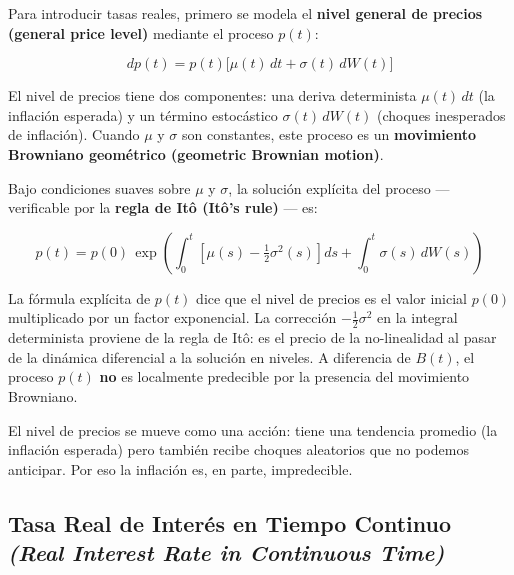 \documentclass[12pt]{article}
\begin{document}
Para introducir tasas reales, primero se modela el \textbf{nivel general de precios (general price level)} mediante el proceso $p(t)$:

\begin{equation}
  dp(t) = p(t)\bigl[\mu(t)\,dt + \sigma(t)\,dW(t)\bigr]
\end{equation}

\begin{intuicionmat}
El nivel de precios tiene dos componentes: una deriva determinista $\mu(t)\,dt$ (la inflaci\'on esperada) y un t\'ermino estoc\'astico $\sigma(t)\,dW(t)$ (choques inesperados de inflaci\'on). Cuando $\mu$ y $\sigma$ son constantes, este proceso es un \textbf{movimiento Browniano geom\'etrico (geometric Brownian motion)}.
\end{intuicionmat}

Bajo condiciones suaves sobre $\mu$ y $\sigma$, la soluci\'on expl\'icita del proceso --- verificable por la \textbf{regla de It\^o (It\^o's rule)} --- es:

\begin{equation}
  p(t) = p(0)\,\exp\!\left(\int_0^t\!\left[\mu(s) - \tfrac{1}{2}\sigma^2(s)\right]ds + \int_0^t\!\sigma(s)\,dW(s)\right)
\end{equation}

\begin{intuicionmat}
La f\'ormula expl\'icita de $p(t)$ dice que el nivel de precios es el valor inicial $p(0)$ multiplicado por un factor exponencial. La correcci\'on $-\frac{1}{2}\sigma^2$ en la integral determinista proviene de la regla de It\^o: es el precio de la no-linealidad al pasar de la din\'amica diferencial a la soluci\'on en niveles. A diferencia de $B(t)$, el proceso $p(t)$ \textbf{no} es localmente predecible por la presencia del movimiento Browniano.
\end{intuicionmat}

\begin{intuicion}
El nivel de precios se mueve como una acci\'on: tiene una tendencia promedio (la inflaci\'on esperada) pero tambi\'en recibe choques aleatorios que no podemos anticipar. Por eso la inflaci\'on es, en parte, impredecible.
\end{intuicion}

\subsection{Tasa Real de Inter\'es en Tiempo Continuo \textit{(Real Interest Rate in Continuous Time)}}
\end{document}

